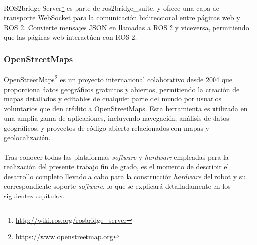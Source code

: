 ROS2bridge Server\footnote{\url{http://wiki.ros.org/rosbridge_server}} es parte de ros2bridge\_suite, y ofrece una capa de transporte WebSocket para la comunicación bidireccional entre páginas web y ROS 2. Convierte mensajes JSON en llamadas a ROS 2 y viceversa, permitiendo que las páginas web interactúen con ROS 2. 

\subsubsection{OpenStreetMaps}
\label{subsubsec:openstreetmaps}

OpenStreetMaps\footnote{\url{https://www.openstreetmap.org}} es un proyecto internacional colaborativo desde 2004 que proporciona datos geográficos gratuitos y abiertos, permitiendo la creación de mapas detallados y editables de cualquier parte del mundo por usuarios voluntarios que den crédito a OpenStreetMaps. Esta herramienta es utilizada en una amplia gama de aplicaciones, incluyendo navegación, análisis de datos geográficos, y proyectos de código abierto relacionados con mapas y geolocalización.\\\\



Tras conocer todas las plataformas \textit{software} y \textit{hardware} empleadas para la realización del presente trabajo fin de grado, es el momento de describir el desarrollo completo llevado a cabo para la construcción \textit{hardware} del robot y su correspondiente soporte \textit{software}, lo que se explicará detalladamente en los siguientes capítulos.
